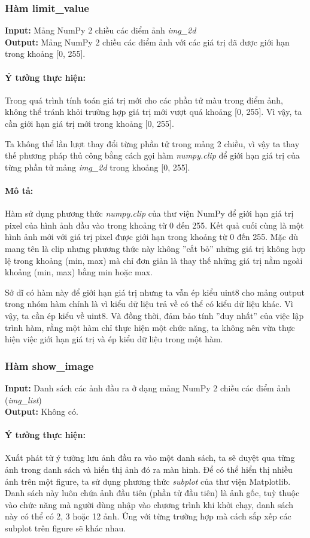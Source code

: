 \documentclass{article}
\begin{document}
\subsubsection{Hàm limit\_value}
\textbf{Input:} Mảng NumPy 2 chiều các điểm ảnh \textit{img\_2d} \\
\textbf{Output:} Mảng NumPy 2 chiều các điểm ảnh với các giá trị đã được giới hạn trong khoảng [0, 255].

\paragraph{Ý tưởng thực hiện:} Trong quá trình tính toán giá trị mới cho các phần tử màu trong điểm ảnh, không thể tránh khỏi trường hợp giá trị mới vượt quá khoảng [0, 255]. Vì vậy, ta cần giới hạn giá trị mới trong khoảng [0, 255]. \par
Ta không thể lần lượt thay đổi từng phần tử trong mảng 2 chiều, vì vậy ta thay thế phương pháp thủ công bằng cách gọi hàm \textit{numpy.clip} để giới hạn giá trị của từng phần tử mảng \textit{img\_2d} trong khoảng [0, 255].
\paragraph{Mô tả:} Hàm sử dụng phương thức \textit{numpy.clip} của thư viện NumPy để giới hạn giá trị pixel của hình ảnh đầu vào trong khoảng từ 0 đến 255. Kết quả cuối cùng là một hình ảnh mới với giá trị pixel được giới hạn trong khoảng từ 0 đến 255. Mặc dù mang tên là clip nhưng phương thức này không ''cắt bỏ'' những giá trị không hợp lệ trong khoảng (min, max) mà chỉ đơn giản là thay thế những giá trị nằm ngoài khoảng (min, max) bằng min hoặc max. \par
Sở dĩ có hàm này để giới hạn giá trị nhưng ta vẫn ép kiểu uint8 cho mảng output trong nhóm hàm chính là vì kiểu dữ liệu trả về có thể có kiểu dữ liệu khác. Vì vậy, ta cần ép kiểu về uint8. Và đồng thời, đảm bảo tính ''duy nhất'' của việc lập trình hàm, rằng một hàm chỉ thực hiện một chức năng, ta không nên vừa thực hiện việc giới hạn giá trị và ép kiểu dữ liệu trong một hàm. 
\subsubsection{Hàm show\_image}
\textbf{Input:} Danh sách các ảnh đầu ra ở dạng mảng NumPy 2 chiều các điểm ảnh (\textit{img\_list}) \\
\textbf{Output:} Không có.

\paragraph{Ý tưởng thực hiện:} Xuất phát từ ý tưởng lưu ảnh đầu ra vào một danh sách, ta sẽ duyệt qua từng ảnh trong danh sách và hiển thị ảnh đó ra màn hình. Để có thể hiển thị nhiều ảnh trên một figure, ta sử dụng phương thức \textit{subplot} của thư viện Matplotlib. Danh sách này luôn chứa ảnh đầu tiên (phần tử đầu tiên) là ảnh gốc, tuỳ thuộc vào chức năng mà người dùng nhập vào chương trình khi khởi chạy, danh sách này có thể có 2, 3 hoặc 12 ảnh. Ứng với từng trường hợp mà cách sắp xếp các subplot trên figure sẽ khác nhau.  
\end{document}
